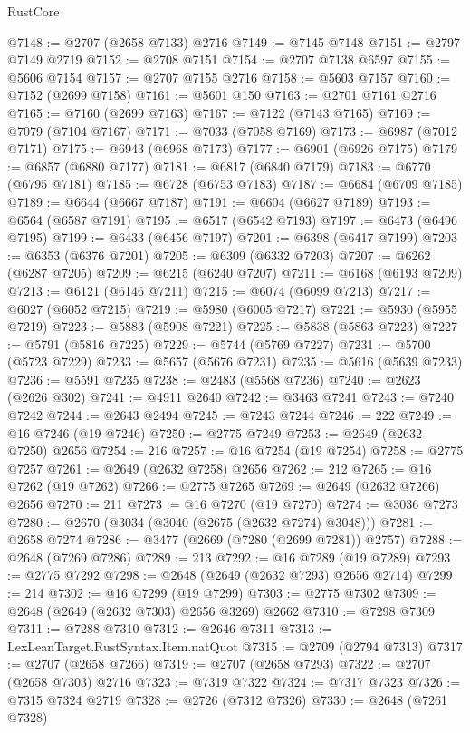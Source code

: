 \begin{lexlean}{RustCore}
\begin{coremodule}
@7148 := @2707 (@2658 @7133) @2716
@7149 := @7145 @7148
@7151 := @2797 @7149 @2719
@7152 := @2708 @7151
@7154 := @2707 @7138 @6597
@7155 := @5606 @7154
@7157 := @2707 @7155 @2716
@7158 := @5603 @7157
@7160 := @7152 (@2699 @7158)
@7161 := @5601 @150
@7163 := @2701 @7161 @2716
@7165 := @7160 (@2699 @7163)
@7167 := @7122 (@7143 @7165)
@7169 := @7079 (@7104 @7167)
@7171 := @7033 (@7058 @7169)
@7173 := @6987 (@7012 @7171)
@7175 := @6943 (@6968 @7173)
@7177 := @6901 (@6926 @7175)
@7179 := @6857 (@6880 @7177)
@7181 := @6817 (@6840 @7179)
@7183 := @6770 (@6795 @7181)
@7185 := @6728 (@6753 @7183)
@7187 := @6684 (@6709 @7185)
@7189 := @6644 (@6667 @7187)
@7191 := @6604 (@6627 @7189)
@7193 := @6564 (@6587 @7191)
@7195 := @6517 (@6542 @7193)
@7197 := @6473 (@6496 @7195)
@7199 := @6433 (@6456 @7197)
@7201 := @6398 (@6417 @7199)
@7203 := @6353 (@6376 @7201)
@7205 := @6309 (@6332 @7203)
@7207 := @6262 (@6287 @7205)
@7209 := @6215 (@6240 @7207)
@7211 := @6168 (@6193 @7209)
@7213 := @6121 (@6146 @7211)
@7215 := @6074 (@6099 @7213)
@7217 := @6027 (@6052 @7215)
@7219 := @5980 (@6005 @7217)
@7221 := @5930 (@5955 @7219)
@7223 := @5883 (@5908 @7221)
@7225 := @5838 (@5863 @7223)
@7227 := @5791 (@5816 @7225)
@7229 := @5744 (@5769 @7227)
@7231 := @5700 (@5723 @7229)
@7233 := @5657 (@5676 @7231)
@7235 := @5616 (@5639 @7233)
@7236 := @5591 @7235
@7238 := @2483 (@5568 @7236)
@7240 := @2623 (@2626 @302)
@7241 := @4911 @2640
@7242 := @3463 @7241
@7243 := @7240 @7242
@7244 := @2643 @2494
@7245 := @7243 @7244
@7246 := 222
@7249 := @16 @7246 (@19 @7246)
@7250 := @2775 @7249
@7253 := @2649 (@2632 @7250) @2656
@7254 := 216
@7257 := @16 @7254 (@19 @7254)
@7258 := @2775 @7257
@7261 := @2649 (@2632 @7258) @2656
@7262 := 212
@7265 := @16 @7262 (@19 @7262)
@7266 := @2775 @7265
@7269 := @2649 (@2632 @7266) @2656
@7270 := 211
@7273 := @16 @7270 (@19 @7270)
@7274 := @3036 @7273
@7280 := @2670 (@3034 (@3040 (@2675 (@2632 @7274) @3048)))
@7281 := @2658 @7274
@7286 := @3477 (@2669 (@7280 (@2699 @7281)) @2757)
@7288 := @2648 (@7269 @7286)
@7289 := 213
@7292 := @16 @7289 (@19 @7289)
@7293 := @2775 @7292
@7298 := @2648 (@2649 (@2632 @7293) @2656 @2714)
@7299 := 214
@7302 := @16 @7299 (@19 @7299)
@7303 := @2775 @7302
@7309 := @2648 (@2649 (@2632 @7303) @2656 @3269) @2662
@7310 := @7298 @7309
@7311 := @7288 @7310
@7312 := @2646 @7311
@7313 := LexLeanTarget.RustSyntax.Item.natQuot
@7315 := @2709 (@2794 @7313)
@7317 := @2707 (@2658 @7266)
@7319 := @2707 (@2658 @7293)
@7322 := @2707 (@2658 @7303) @2716
@7323 := @7319 @7322
@7324 := @7317 @7323
@7326 := @7315 @7324 @2719
@7328 := @2726 (@7312 @7326)
@7330 := @2648 (@7261 @7328)

\end{coremodule}
\end{lexlean}
